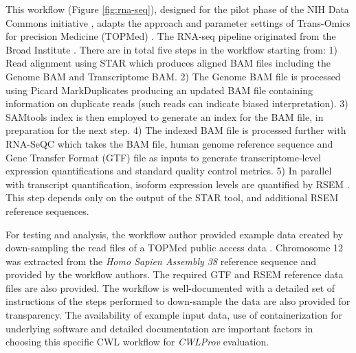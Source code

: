 \documentclass[a4paper,num-refs]{oup-contemporary}
\begin{document}
This workflow (Figure \ref{fig:rna-seq}), designed for the pilot phase of the NIH Data Commons initiative \citep{NIH-PILOT}, adapts the approach and parameter settings of Trans-Omics for precision Medicine (TOPMed) \citep{TransOmi24}. The RNA-seq pipeline originated from the Broad Institute \citep{gtexpipe}. There are in total five steps in the workflow starting from: 
 1) Read alignment using STAR \citep{Dobin2012} which produces aligned BAM files including the Genome BAM and Transcriptome BAM.
 2) The Genome BAM file is processed using Picard MarkDuplicates \citep{MarkDuplicates} producing an updated BAM file containing information on duplicate reads (such reads can indicate biased interpretation).
 3) SAMtools index \citep{li2009sequence} is then employed to generate an index for the BAM file, in preparation for the next step.
 4) The indexed BAM file is processed further with RNA-SeQC \citep{DeLuca2012} which takes the BAM file, human genome reference sequence and Gene Transfer Format (GTF) file as inputs to generate transcriptome-level expression quantifications and standard quality control metrics.
 5) In parallel with transcript quantification, isoform expression levels are quantified by RSEM \citep{li2011rsem}. This step depends only on the output of the STAR tool, and additional RSEM reference sequences. 
 
For testing and analysis, the workflow author provided example data created by down-sampling the read files of a TOPMed public access data \citep{seo2012transcriptional}. Chromosome 12 was extracted from the \textit{Homo Sapien Assembly 38} reference sequence and provided by the workflow authors. The required GTF and RSEM reference data files are also provided. The workflow is well-documented with a detailed set of instructions of the steps performed to down-sample the data are also provided for transparency. The availability of example input data, use of containerization for underlying software and detailed documentation are important factors in choosing this specific CWL workflow for \textit{CWLProv} evaluation.
\end{document}
